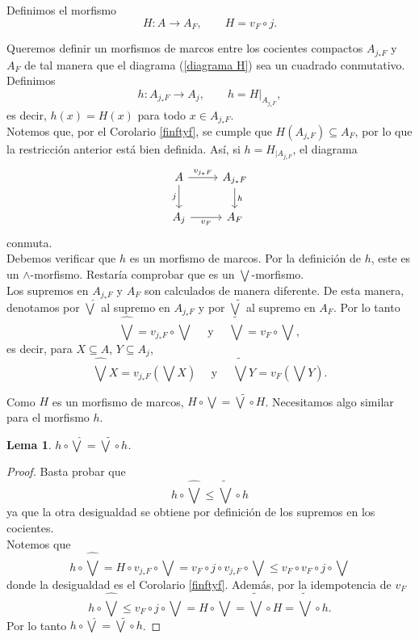 \documentclass[12pt]{article}
\newtheorem{lem}[thm]{Lema}
\begin{document}
Definimos el morfismo 
\[
H\colon A\to A_F, \qquad H=v_F\circ j.
\]

Queremos definir un morfismos de marcos entre los cocientes compactos $A_{j_*F}$ y $A_F$ de tal manera que 
el diagrama (\ref{diagrama H}) sea un cuadrado conmutativo.\\

Definimos
\[
h\colon A_{j_*F}\to A_j, \qquad h=H|_{A_{j_*F}},
\]
es decir, $h(x)=H(x)$ para todo $x\in A_{j_*F}$.\\

Notemos que, por el Corolario \ref{finftyf}, se cumple que $H(A_{j_*F})\subseteq A_F$, por lo que la restricción anterior 
está bien definida. Así, si $h=H_{\mid{A_{j_*F}}}$, el diagrama 
\[\begin{tikzcd}
	A & {A_{j_*F}} \\
	{A_j} & {A_F}
	\arrow["{v_{j_*F}}", from=1-1, to=1-2]
	\arrow["j"', from=1-1, to=2-1]
	\arrow["h", from=1-2, to=2-2]
	\arrow["{v_F}"', from=2-1, to=2-2]
\end{tikzcd}\]
conmuta.\\

Debemos verificar que $h$ es un morfismo de marcos. Por la definición de $h$, este es un $\wedge$-morfismo. Restaría comprobar que es un $\bigvee$-morfismo.\\

Los supremos en $A_{j_*F}$ y $A_F$ son calculados de manera diferente. De esta manera, denotamos por $\hat{\bigvee}$ al supremo en $A_{j_*F}$ y por $\tilde{\bigvee}$ al supremo en $A_F$. Por lo tanto
\[
\hat{\bigvee}=v_{j_*F}\circ \bigvee\quad\mbox{ y }\quad \tilde{\bigvee}=v_{F}\circ \bigvee,
\] 
es decir, para $X\subseteq A$, $Y\subseteq A_j$,
\[
	\hat{\bigvee}X=v_{j_*F}(\bigvee X)\quad\mbox{ y }\quad \tilde{\bigvee}Y=v_{F}(\bigvee Y).
\]

Como $H$ es un morfismo de marcos, $H\circ \bigvee=\tilde{\bigvee}\circ H$. Necesitamos algo similar para el morfismo $h$.

\begin{lem}\label{bigvee g}
$h\circ \hat{\bigvee}=\tilde{\bigvee}\circ h$.
\end{lem}

\begin{proof}
Basta probar que 
\[
h\circ \hat{\bigvee}\leq \tilde{\bigvee}\circ h
\]
ya que la otra desigualdad se obtiene por definición de los supremos en los cocientes.\\

Notemos que
\[
h\circ \hat{\bigvee}=H\circ v_{j_*F}\circ \bigvee=v_F\circ j\circ v_{j_*F}\circ \bigvee\leq v_F\circ v_F\circ j\circ \bigvee
\]
donde la desigualdad es el Corolario \ref{finftyf}. Además, por la idempotencia de $v_F$ 
\[
h\circ\hat{\bigvee}\leq v_F\circ j\circ \bigvee =H\circ \bigvee=\tilde{\bigvee}\circ H=\tilde{\bigvee}\circ h.
\]
Por lo tanto $h\circ\hat{\bigvee}=\tilde{\bigvee}\circ h$.
\end{proof}
\end{document}
